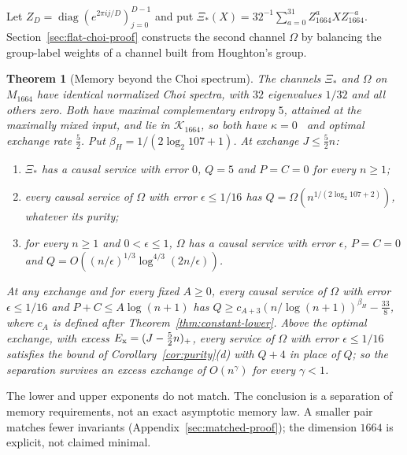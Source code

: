 \documentclass[11pt,a4paper]{article}
\theoremstyle{plain}
\newtheorem{mainthm}{Theorem}
\theoremstyle{definition}
\theoremstyle{remark}
\begin{document}
Let $Z_D=\operatorname{diag}(e^{2\pi ij/D})_{j=0}^{D-1}$ and put
$\Xi_*(X)=32^{-1}\sum_{a=0}^{31}Z_{1664}^aXZ_{1664}^{-a}$.
Section~\ref{sec:flat-choi-proof} constructs the second channel $\Omega$ by
balancing the group-label weights of a channel built from Houghton's group.

\begin{mainthm}[Memory beyond the Choi spectrum]\label{thm:flat-choi-separation}
The channels $\Xi_*$ and $\Omega$ on $M_{1664}$ have identical normalized Choi spectra, with $32$ eigenvalues $1/32$ and all others zero.
Both have maximal complementary entropy $5$, attained at the maximally mixed input, and lie in $\mathcal K_{1664}$, so both have
$\kappa=0$~\cite[Section~8]{Douglas2026closed} and optimal exchange rate $\frac52$. Put $\beta_H=1/(2\log_2 107+1)$.
At exchange $J\le\frac52n$:
\begin{enumerate}[label=(\alph*)]
\item $\Xi_*$ has a causal service with error $0$, $Q=5$ and $P=C=0$ for every $n\ge1$;
\item every causal service of $\Omega$ with error $\epsilon\le1/16$ has $Q=\Omega(n^{1/(2\log_2 107+2)})$, whatever its purity;
\item for every $n\ge1$ and $0<\epsilon\le1$, $\Omega$ has a causal service with error $\epsilon$, $P=C=0$ and
$Q=O((n/\epsilon)^{1/3}\log^{4/3}(2n/\epsilon))$.
\end{enumerate}
At any exchange and for every fixed $A\ge0$, every causal service of $\Omega$ with error $\epsilon\le1/16$ and $P+C\le A\log(n+1)$ has
$Q\ge c_{A+3}(n/\log(n+1))^{\beta_H}-\frac{33}{8}$, where $c_A$ is defined after Theorem~\ref{thm:constant-lower}.
Above the optimal exchange, with excess $E_{\rm x}=(J-\frac52n)_+$, every service of $\Omega$ with error $\epsilon\le1/16$ satisfies the bound of
Corollary~\ref{cor:purity}(d) with $Q+4$ in place of $Q$; so the separation survives an excess exchange of $O(n^\gamma)$ for every $\gamma<1$.
\end{mainthm}



The lower and upper exponents do not match. The conclusion is a separation
of memory requirements, not an exact asymptotic memory law. A smaller pair
matches fewer invariants (Appendix~\ref{sec:matched-proof}); the dimension
$1664$ is explicit, not claimed minimal.
\end{document}
